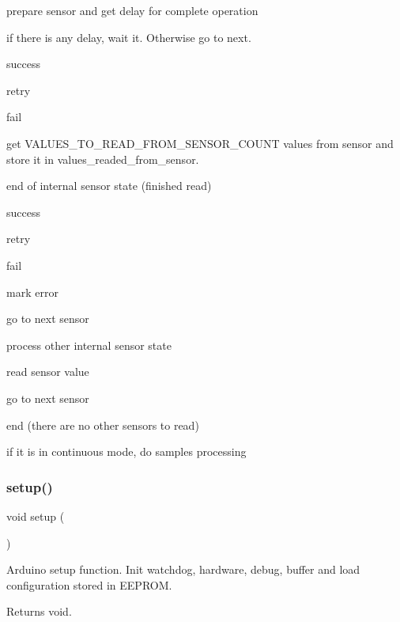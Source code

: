 prepare sensor and get delay for complete operation

if there is any delay, wait it. Otherwise go to next.

success

retry

fail

get V\+A\+L\+U\+E\+S\+\_\+\+T\+O\+\_\+\+R\+E\+A\+D\+\_\+\+F\+R\+O\+M\+\_\+\+S\+E\+N\+S\+O\+R\+\_\+\+C\+O\+U\+NT values from sensor and store it in values\+\_\+readed\+\_\+from\+\_\+sensor.

end of internal sensor state (finished read)

success

retry

fail

mark error

go to next sensor

process other internal sensor state

read sensor value

go to next sensor

end (there are no other sensors to read)

if it is in continuous mode, do samples processing \mbox{\label{i2c-th_8ino_a4fc01d736fe50cf5b977f755b675f11d}} 
\subsubsection{\texorpdfstring{setup()}{setup()}}
{\footnotesize\ttfamily void setup (\begin{DoxyParamCaption}{ }\end{DoxyParamCaption})}



Arduino setup function. Init watchdog, hardware, debug, buffer and load configuration stored in E\+E\+P\+R\+OM. 

\begin{DoxyReturn}{Returns}
void. 
\end{DoxyReturn}

